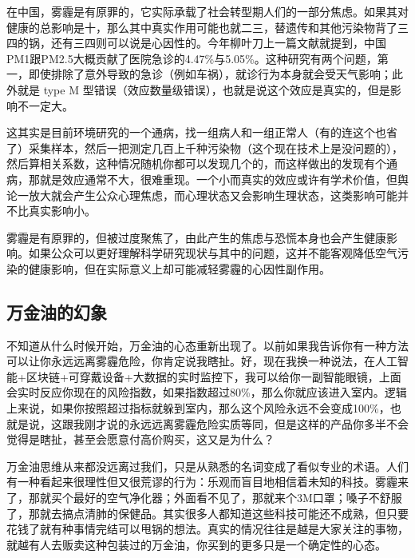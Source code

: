 \documentclass[]{book}
\begin{document}
在中国，雾霾是有原罪的，它实际承载了社会转型期人们的一部分焦虑。如果其对健康的总影响是十，那么其中真实作用可能也就二三，替遗传和其他污染物背了三四的锅，还有三四则可以说是心因性的。今年柳叶刀上一篇文献就提到，中国PM1跟PM2.5大概贡献了医院急诊的4.47\%与5.05\%。这种研究有两个问题，第一，即使排除了意外导致的急诊（例如车祸），就诊行为本身就会受天气影响；此外就是 type M 型错误（效应数量级错误），也就是说这个效应是真实的，但是影响不一定大。

这其实是目前环境研究的一个通病，找一组病人和一组正常人（有的连这个也省了）采集样本，然后一把测定几百上千种污染物（这个现在技术上是没问题的），然后算相关系数，这种情况随机你都可以发现几个的，而这样做出的发现有个通病，那就是效应通常不大，很难重现。一个小而真实的效应或许有学术价值，但舆论一放大就会产生公众心理焦虑，而心理状态又会影响生理状态，这类影响可能并不比真实影响小。

雾霾是有原罪的，但被过度聚焦了，由此产生的焦虑与恐慌本身也会产生健康影响。如果公众可以更好理解科学研究现状与其中的问题，这并不能客观降低空气污染的健康影响，但在实际意义上却可能减轻雾霾的心因性副作用。

\hypertarget{ux4e07ux91d1ux6cb9ux7684ux5e7bux8c61}{%
\subsection{万金油的幻象}\label{ux4e07ux91d1ux6cb9ux7684ux5e7bux8c61}}

不知道从什么时候开始，万金油的心态重新出现了。以前如果我告诉你有一种方法可以让你永远远离雾霾危险，你肯定说我瞎扯。好，现在我换一种说法，在人工智能+区块链+可穿戴设备+大数据的实时监控下，我可以给你一副智能眼镜，上面会实时反应你现在的风险指数，如果指数超过80\%，那么你就应该进入室内。逻辑上来说，如果你按照超过指标就躲到室内，那么这个风险永远不会变成100\%，也就是说，这跟我刚才说的永远远离雾霾危险实质等同，但是这样的产品你多半不会觉得是瞎扯，甚至会愿意付高价购买，这又是为什么？

万金油思维从来都没远离过我们，只是从熟悉的名词变成了看似专业的术语。人们有一种看起来很理性但又很荒谬的行为：乐观而盲目地相信着未知的科技。雾霾来了，那就买个最好的空气净化器；外面看不见了，那就来个3M口罩；嗓子不舒服了，那就去搞点清肺的保健品。其实很多人都知道这些科技可能还不成熟，但只要花钱了就有种事情完结可以甩锅的想法。真实的情况往往是越是大家关注的事物，就越有人去贩卖这种包装过的万金油，你买到的更多只是一个确定性的心态。
\end{document}
